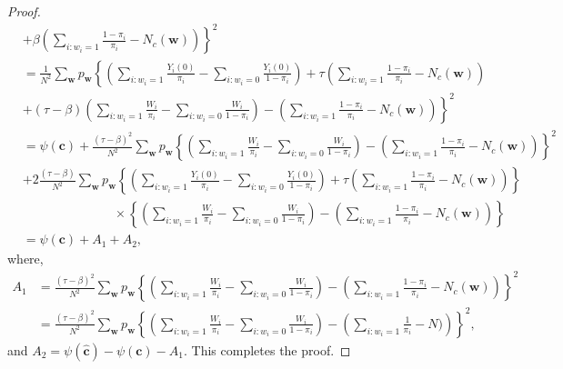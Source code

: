 \documentclass[12pt]{article}
\begin{document}
\begin{proof}
\begin{align}
    &+ \left. \beta \left(\sum_{i:w_i = 1}\frac{1-\pi_i}{\pi_i} - N_c(\bm{w}) \right)\right\}^2 \nonumber \\
    & = \frac{1}{N^2} \sum_{\bm{w}}p_{\bm{w}} \left\{ \left(\sum_{i:w_i = 1}\frac{Y_i(0)}{\pi_i} - \sum_{i:w_i = 0}\frac{Y_i(0)}{1-\pi_i} \right) + \tau \left( \sum_{i:w_i = 1}\frac{1-\pi_i}{\pi_i} - N_c(\bm{w}) \right) \right. \nonumber \\
 & + \left. (\tau - \beta) \left(\sum_{i:w_i = 1}\frac{W_i}{\pi_i} - \sum_{i:w_i = 0}\frac{W_i}{1-\pi_i}\right) - \left(\sum_{i:w_i = 1}\frac{1-\pi_i}{\pi_i} - N_c(\bm{w}) \right)\right\}^2 \nonumber \\
 & = \psi(\bm{c}) + \frac{(\tau - \beta)^2}{N^2}\sum_{\bm{w}}p_{\bm{w}}\left\{\left(\sum_{i:w_i = 1}\frac{W_i}{\pi_i} - \sum_{i:w_i = 0}\frac{W_i}{1-\pi_i}\right) - \left(\sum_{i:w_i = 1}\frac{1-\pi_i}{\pi_i} - N_c(\bm{w}) \right)\right\}^2 \nonumber \\
 & + 2\frac{(\tau - \beta)}{N^2}\sum_{\bm{w}}p_{\bm{w}}\left\{ \left(\sum_{i:w_i = 1}\frac{Y_i(0)}{\pi_i} - \sum_{i:w_i = 0}\frac{Y_i(0)}{1-\pi_i} \right) + \tau \left( \sum_{i:w_i = 1}\frac{1-\pi_i}{\pi_i} - N_c(\bm{w}) \right) \right\} \nonumber \\
 & \hspace{3cm} \times \left\{\left(\sum_{i:w_i = 1}\frac{W_i}{\pi_i} - \sum_{i:w_i = 0}\frac{W_i}{1-\pi_i}\right) - \left(\sum_{i:w_i = 1}\frac{1-\pi_i}{\pi_i} - N_c(\bm{w}) \right)\right\} \nonumber \\
 & = \psi(\bm{c}) + A_1 + A_2, \label{eq_A_impute3}
\end{align}
where,
\begin{align}
A_1 &=  \frac{(\tau - \beta)^2}{N^2}\sum_{\bm{w}}p_{\bm{w}}\left\{\left(\sum_{i:w_i = 1}\frac{W_i}{\pi_i} - \sum_{i:w_i = 0}\frac{W_i}{1-\pi_i}\right) - \left(\sum_{i:w_i = 1}\frac{1-\pi_i}{\pi_i} - N_c(\bm{w}) \right)\right\}^2    \nonumber \\
& = \frac{(\tau - \beta)^2}{N^2}\sum_{\bm{w}}p_{\bm{w}}\left\{\left(\sum_{i:w_i = 1}\frac{W_i}{\pi_i} - \sum_{i:w_i = 0}\frac{W_i}{1-\pi_i}\right) - \left(\sum_{i:w_i = 1}\frac{1}{\pi_i} - N) \right)\right\}^2,
\end{align}
and $A_2 = \psi(\hat{\bm{c}}) -\psi(\bm{c}) - A_1$. 
This completes the proof.
\end{proof}
\end{document}
